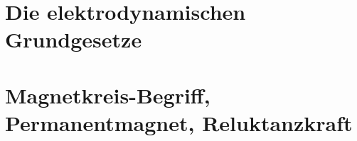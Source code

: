 \documentclass[10pt,twoside,a4paper,fleqn]{article}
\begin{document}
\setcounter{tocdepth}{2} 	%
\tableofcontents 				%
\newpage
\section{Die elektrodynamischen Grundgesetze}

\section{Magnetkreis-Begriff, Permanentmagnet, Reluktanzkraft}

\end{document}

